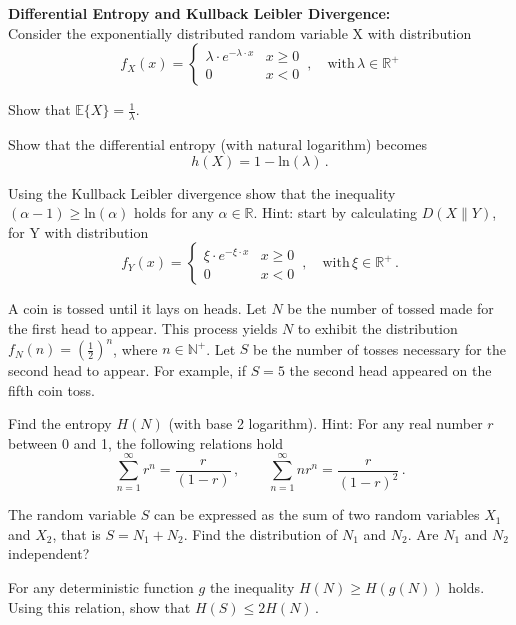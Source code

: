 \textbf{Differential Entropy and Kullback Leibler Divergence:}\\
%
%
Consider the exponentially distributed random variable X with distribution
\begin{equation*}
f_X(x) = 
\begin{cases} 
      \lambda \cdot e^{-\lambda \cdot x} & x\geq 0 \\
      0 &  x < 0 
 \end{cases} \, , \quad
 \text{with} \, \lambda\in\mathbb{R}^{+}
\end{equation*}
%
%
%
\begin{enumref}
%
%
\item Show that $\mathbb{E}\{X\} = \frac{1}{\lambda}$.
\item Show that the differential entropy (with natural logarithm) becomes
%
$$
h(X) = 1 -\text{ln}(\lambda) \, .
$$
\item Using the Kullback Leibler divergence show that the inequality $(\alpha -1) \geq \text{ln} (\alpha)$ holds for any $\alpha \in \mathbb{R}$.
Hint: start by calculating $D(X \| Y)$, for Y with distribution
\begin{equation*}
f_Y(x) = 
\begin{cases} 
      \xi \cdot e^{-\xi \cdot x} & x\geq 0 \\
      0 &  x < 0 
 \end{cases} \, , \quad
 \text{with} \, \xi \in\mathbb{R}^{+} \, . 
\end{equation*}
%
\end{enumref}

A coin is tossed until it lays on heads. Let $N$ be the number of tossed made for the first head to appear. This process yields $N$ to exhibit the distribution $f_{N}(n) = \left ( \frac{1}{2} \right ) ^{n}$, where $n \in \mathbb{N}^{+}$.
Let $S$ be the number of tosses necessary for the second head to appear. For example, if $S=5$ the second head appeared on the fifth coin toss.

\begin{enumref}[resume]
\item Find the entropy $H(N)$ (with base 2 logarithm). Hint: For any real number $r$ between 0 and 1, the following relations hold
$$
\sum_{n=1}^{\infty} r^{n} = \frac{r}{(1-r)}\, , \qquad \sum_{n=1}^{\infty} n r^{n} = \frac{r}{(1-r)^2}\, .
$$

\item The random variable $S$ can be expressed as the sum of two random variables $X_1$ and $X_2$, that is $S = N_1 + N_2$. Find the distribution of $N_1$ and $N_2$. Are $N_1$ and $N_2$ independent?

\item For any deterministic function $g$ the inequality $H(N) \geq H(g(N))$ holds. Using this relation, show that
$
H(S) \leq 2 H(N)\, .
$
\end{enumref}
